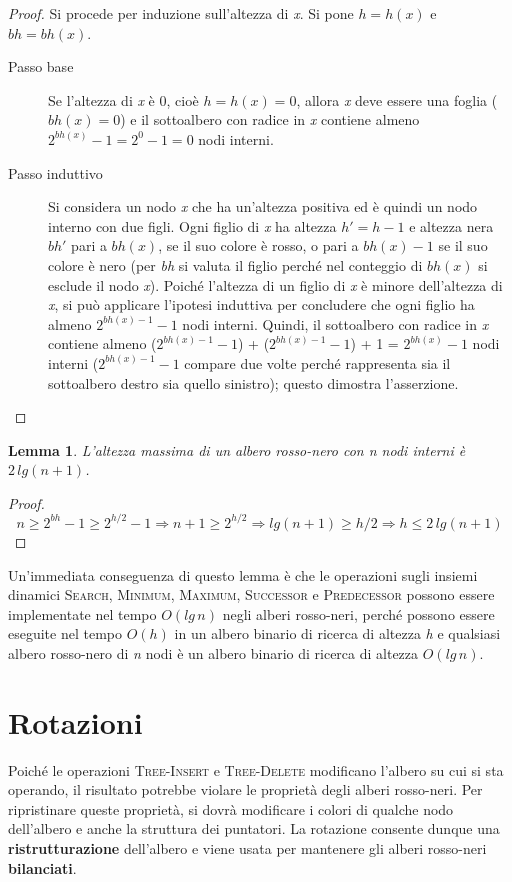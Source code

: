 \documentclass[10pt, a4paper]{report}
\newtheorem{lemma}{Lemma}[chapter]
\begin{document}
\begin{proof}
Si procede per induzione sull'altezza di \textit{x}. Si pone $h = h(x)$ e $bh = bh(x)$.
\begin{description}
\item[Passo base]Se l'altezza di \textit{x} è 0, cioè $h = h(x) = 0$, allora \textit{x} deve essere una foglia ($bh(x) = 0$) e il sottoalbero con radice in \textit{x} contiene almeno $2^{bh(x)} - 1 = 2^0 -1 = 0$ nodi interni.
\item[Passo induttivo]Si considera un nodo \textit{x} che ha un'altezza positiva ed è quindi un nodo interno con due figli. Ogni figlio di \textit{x} ha altezza $h' = h - 1$ e altezza nera $bh'$ pari a $bh(x)$, se il suo colore è rosso, o pari a $bh(x) - 1$ se il suo colore è nero (per \textit{bh} si valuta il figlio perché nel conteggio di $bh(x)$ si esclude il nodo \textit{x}). Poiché l'altezza di un figlio di \textit{x} è minore dell'altezza di \textit{x}, si può applicare l'ipotesi induttiva per concludere che ogni figlio ha almeno $2^{bh(x) - 1} - 1$ nodi interni. Quindi, il sottoalbero con radice in \textit{x} contiene almeno ($2^{bh(x) - 1} - 1$) + ($2^{bh(x) - 1} - 1$) + 1 = $2^{bh(x)} - 1$ nodi interni ($2^{bh(x) - 1} - 1$ compare due volte perché rappresenta sia il sottoalbero destro sia quello sinistro); questo dimostra l'asserzione.
\end{description}
\end{proof}
\begin{lemma}
L'altezza massima di un albero rosso-nero con \textit{n} nodi interni è $2\,lg(n + 1)$.
\end{lemma}
\begin{proof}
\begin{equation*}
n \geq 2^{bh} - 1 \geq 2^{h/2} - 1 \Rightarrow n + 1 \geq 2^{h/2} \Rightarrow lg(n + 1) \geq h/2 \Rightarrow h \leq 2\,lg(n + 1)
\end{equation*}
\end{proof}
Un'immediata conseguenza di questo lemma è che le operazioni sugli insiemi dinamici \textsc{Search}, \textsc{Minimum}, \textsc{Maximum}, \textsc{Successor} e \textsc{Predecessor} possono essere implementate nel tempo $O(lg\,n)$ negli alberi rosso-neri, perché possono essere eseguite nel tempo $O(h)$ in un albero binario di ricerca di altezza \textit{h} e qualsiasi albero rosso-nero di \textit{n} nodi è un albero binario di ricerca di altezza $O(lg\,n)$.
\section{Rotazioni}
Poiché le operazioni \textsc{Tree-Insert} e \textsc{Tree-Delete} modificano l'albero su cui si sta operando, il risultato potrebbe violare le proprietà degli alberi rosso-neri. Per ripristinare queste proprietà, si dovrà modificare i colori di qualche nodo dell'albero e anche la struttura dei puntatori. La rotazione consente dunque una \textbf{ristrutturazione} dell'albero e viene usata per mantenere gli alberi rosso-neri \textbf{bilanciati}.
\end{document}
